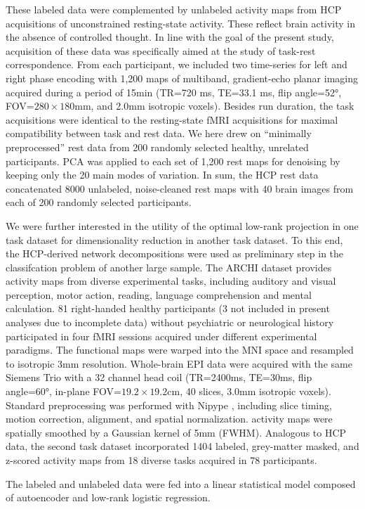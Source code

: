 \documentclass{article} %
\begin{document}
These labeled data were complemented by unlabeled activity maps
from HCP acquisitions of unconstrained resting-state activity.
These reflect brain activity in the absence of controlled thought.
In line with the goal of the present study, acquisition of these data was
specifically aimed at the study of task-rest correspondence.
From each participant, we included two
time-series for left and right phase encoding
with 1,200 maps of multiband, gradient-echo planar imaging acquired
during a period of 15min (TR=720 ms, TE=33.1 ms, flip angle=52°,
FOV=$280\times180$mm, and 2.0mm isotropic voxels). Besides run duration,
the task acquisitions were identical to the resting-state fMRI acquisitions
for maximal compatibility between task and rest data.
We here drew on ``minimally preprocessed'' rest data
from 200 randomly selected healthy, unrelated participants.
PCA was applied to each set of 1,200 rest maps for
denoising by keeping only the 20 main modes of
variation.
In sum, the HCP rest data concatenated
8000 unlabeled, noise-cleaned rest maps with
40 brain images from each of 200 randomly selected participants.

We were further interested in the utility of the optimal low-rank projection
in one task dataset for dimensionality reduction in another task dataset.
To this end, the HCP-derived network decompositions were used as preliminary
step in the classifcation problem of another large sample.
The ARCHI dataset \cite{pinel07} provides activity maps from
diverse experimental tasks, including auditory and visual perception, motor action,
reading, language comprehension and mental calculation.
81 right-handed healthy participants
(3 not included in present analyses due to incomplete data)
without psychiatric or
neurological history participated in four fMRI sessions acquired under
different experimental paradigms.
The functional maps were warped into
the MNI space and resampled to isotropic 3mm resolution.
Whole-brain EPI data were acquired with the same Siemens Trio with a 32
channel head coil (TR=2400ms, TE=30ms, flip angle=60°, in-plane
FOV=$19.2\times19.2$cm, 40 slices, 3.0mm isotropic voxels).
Standard preprocessing was performed with Nipype \cite{gorgo11}, including
slice timing, motion correction, alignment, and spatial normalization.
activity maps were spatially smoothed by
a Gaussian kernel of 5mm (FWHM).
Analogous to HCP data, the second task dataset incorporated 1404
labeled, grey-matter masked, and z-scored activity maps
from 18 diverse tasks acquired in 78 participants.

The labeled and unlabeled data were fed into a linear statistical model
composed of autoencoder and low-rank logistic regression.
\end{document}
